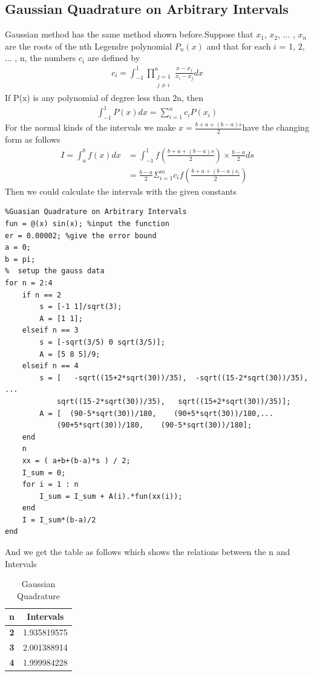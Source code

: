 \documentclass{article}
\begin{document}
\subsection{Gaussian Quadrature on Arbitrary Intervals}
Gaussian method has the same method shown before.Suppose that $x_1$, $x_2$, ... , $x_n$ are the roots of the nth Legendre polynomial $P_n(x)$ and that for
each $i$ = 1, 2, ... , n, the numbers $c_i$ are defined by
\begin{align}
    c_{i}=\int_{-1}^{1} \prod_{\substack{j=1 \\ j \neq i}}^{n} \frac{x-x_{j}}{x_{i}-x_{j}} d x\nonumber
\end{align}
If P(x) is any polynomial of degree less than 2n, then
\begin{align}
    \int_{-1}^{1} P(x) d x=\sum_{i=1}^{n} c_{i} P\left(x_{i}\right)\nonumber
\end{align}
For the normal kinds of the intervals we make $x = \frac{b+a+(b-a)s}{2}$have the changing form as follows
\begin{align}
    I=\int_{a}^{b} f(x) d x &=\int_{-1}^{1} f\left(\frac{b+a+(b-a) s}{2}\right) \times \frac{b-a}{2} d s \nonumber\\
&=\frac{b-a}{2} \Sigma_{i=1}^{m} c_{i} f\left(\frac{b+a+(b-a) s_{i}}{2}\right)\nonumber
\end{align}
Then we could calculate the intervals with the given constants 
\begin{lstlisting}
%Guasian Quadrature on Arbitrary Intervals
fun = @(x) sin(x); %input the function
er = 0.00002; %give the error bound
a = 0;
b = pi;
%  setup the gauss data
for n = 2:4
    if n == 2
        s = [-1 1]/sqrt(3);
        A = [1 1];
    elseif n == 3
        s = [-sqrt(3/5) 0 sqrt(3/5)];
        A = [5 8 5]/9;
    elseif n == 4
        s = [   -sqrt((15+2*sqrt(30))/35),  -sqrt((15-2*sqrt(30))/35), ...
            sqrt((15-2*sqrt(30))/35),   sqrt((15+2*sqrt(30))/35)];
        A = [  (90-5*sqrt(30))/180,    (90+5*sqrt(30))/180,...
            (90+5*sqrt(30))/180,    (90-5*sqrt(30))/180];
    end
    n
    xx = ( a+b+(b-a)*s ) / 2;
    I_sum = 0;
    for i = 1 : n
        I_sum = I_sum + A(i).*fun(xx(i));
    end
    I = I_sum*(b-a)/2
end
\end{lstlisting}
And we get the table as follows which shows the relations between the n and Intervals 
\begin{table}[!ht]
    \centering
    \begin{tabular}{|c|c|}
    \hline
        \textbf{n} & \textbf{Intervals} \\ \hline
        \textbf{2} & 1.935819575 \\ \hline
        \textbf{3} & 2.001388914 \\ \hline
        \textbf{4} & 1.999984228 \\ \hline
    \end{tabular}
    \caption{Gaussian Quadrature}
    \label{GAU}
\end{table}
\end{document}
